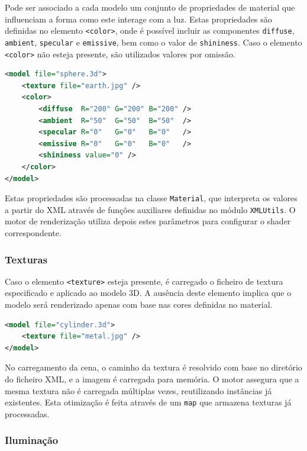 \documentclass[12pt, a4paper]{article}
\begin{document}
Pode ser associado a cada modelo um conjunto de propriedades de material que influenciam a forma
como este interage com a luz. Estas propriedades são definidas no elemento \texttt{<color>}, onde é
possível incluir as componentes \texttt{diffuse}, \texttt{ambient}, \texttt{specular} e
\texttt{emissive}, bem como o valor de \texttt{shininess}. Caso o elemento \texttt{<color>} não
esteja presente, são utilizados valores por omissão.

\begin{lstlisting}[language=xml]
<model file="sphere.3d">
    <texture file="earth.jpg" />
    <color>
        <diffuse  R="200" G="200" B="200" />
        <ambient  R="50"  G="50"  B="50"  />
        <specular R="0"   G="0"   B="0"   />
        <emissive R="0"   G="0"   B="0"   />
        <shininess value="0" />
    </color>
</model>
\end{lstlisting}

Estas propriedades são processadas na classe \texttt{Material}, que interpreta os valores a partir
do XML através de funções auxiliares definidas no módulo \texttt{XMLUtils}. O motor de renderização
utiliza depois estes parâmetros para configurar o shader correspondente.

\subsubsection{Texturas}

Caso o elemento \texttt{<texture>} esteja presente, é carregado o ficheiro de textura especificado
e aplicado ao modelo 3D. A ausência deste elemento implica que o modelo será renderizado apenas com
base nas cores definidas no material.

\begin{lstlisting}[language=xml]
<model file="cylinder.3d">
    <texture file="metal.jpg" />
</model>
\end{lstlisting}

No carregamento da cena, o caminho da textura é resolvido com base no diretório do ficheiro XML, e
a imagem é carregada para memória. O motor assegura que a mesma textura não é carregada múltiplas
vezes, reutilizando instâncias já existentes. Esta otimização é feita através de um \texttt{map}
que armazena texturas já processadas.

\subsubsection{Iluminação}
\end{document}
